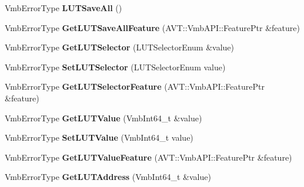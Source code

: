 \begin{DoxyCompactItemize}
\item 
\hypertarget{classMakoCamera_a3394c9ae95f1d001a24458bcc0a11003}{Vmb\-Error\-Type {\bfseries L\-U\-T\-Save\-All} ()}\label{classMakoCamera_a3394c9ae95f1d001a24458bcc0a11003}

\item 
\hypertarget{classMakoCamera_a76eefafae33d3c9aadfbc63be307cab3}{Vmb\-Error\-Type {\bfseries Get\-L\-U\-T\-Save\-All\-Feature} (A\-V\-T\-::\-Vmb\-A\-P\-I\-::\-Feature\-Ptr \&feature)}\label{classMakoCamera_a76eefafae33d3c9aadfbc63be307cab3}

\item 
\hypertarget{classMakoCamera_a3ad68096e1894a97a96154014a1a6d35}{Vmb\-Error\-Type {\bfseries Get\-L\-U\-T\-Selector} (L\-U\-T\-Selector\-Enum \&value)}\label{classMakoCamera_a3ad68096e1894a97a96154014a1a6d35}

\item 
\hypertarget{classMakoCamera_ad36b9ba352ea566eb780786e31355ccb}{Vmb\-Error\-Type {\bfseries Set\-L\-U\-T\-Selector} (L\-U\-T\-Selector\-Enum value)}\label{classMakoCamera_ad36b9ba352ea566eb780786e31355ccb}

\item 
\hypertarget{classMakoCamera_a579e427cf68e08357f39e33386c68e53}{Vmb\-Error\-Type {\bfseries Get\-L\-U\-T\-Selector\-Feature} (A\-V\-T\-::\-Vmb\-A\-P\-I\-::\-Feature\-Ptr \&feature)}\label{classMakoCamera_a579e427cf68e08357f39e33386c68e53}

\item 
\hypertarget{classMakoCamera_ad28aa79e866a18bd4f4b22421ddca155}{Vmb\-Error\-Type {\bfseries Get\-L\-U\-T\-Value} (Vmb\-Int64\-\_\-t \&value)}\label{classMakoCamera_ad28aa79e866a18bd4f4b22421ddca155}

\item 
\hypertarget{classMakoCamera_a03a6a8aa08e19914ecd427fa399c0a7e}{Vmb\-Error\-Type {\bfseries Set\-L\-U\-T\-Value} (Vmb\-Int64\-\_\-t value)}\label{classMakoCamera_a03a6a8aa08e19914ecd427fa399c0a7e}

\item 
\hypertarget{classMakoCamera_a90d21403e8db2ab5c76c6a797f9d71ad}{Vmb\-Error\-Type {\bfseries Get\-L\-U\-T\-Value\-Feature} (A\-V\-T\-::\-Vmb\-A\-P\-I\-::\-Feature\-Ptr \&feature)}\label{classMakoCamera_a90d21403e8db2ab5c76c6a797f9d71ad}

\item 
\hypertarget{classMakoCamera_ac2c355ab0014f20ed83e0fae52cd6871}{Vmb\-Error\-Type {\bfseries Get\-L\-U\-T\-Address} (Vmb\-Int64\-\_\-t \&value)}\label{classMakoCamera_ac2c355ab0014f20ed83e0fae52cd6871}


\end{DoxyCompactItemize}
